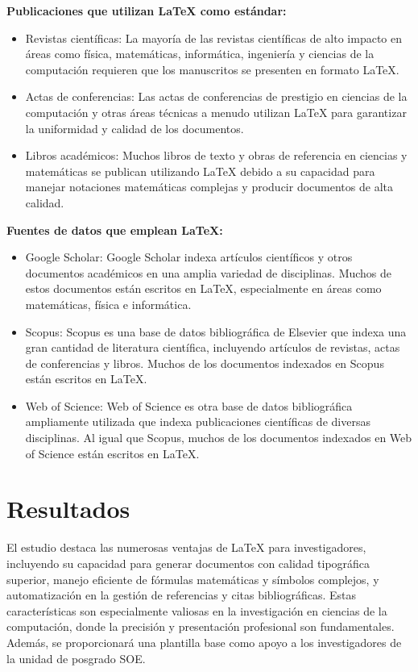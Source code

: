 \documentclass[10pt,twocolumn,a4paper]{article}
\begin{document}
{\raggedleft \textbf{Publicaciones que utilizan LaTeX como estándar:}}

\begin{itemize}
	\item Revistas científicas: La mayoría de las revistas científicas de alto impacto en áreas como física, matemáticas, informática, ingeniería y ciencias de la computación requieren que los manuscritos se presenten en formato LaTeX.
	\item Actas de conferencias: Las actas de conferencias de prestigio en ciencias de la computación y otras áreas técnicas a menudo utilizan LaTeX para garantizar la uniformidad y calidad de los documentos.
	\item Libros académicos: Muchos libros de texto y obras de referencia en ciencias y matemáticas se publican utilizando LaTeX debido a su capacidad para manejar notaciones matemáticas complejas y producir documentos de alta calidad.
\end{itemize}

{\raggedleft \textbf{Fuentes de datos que emplean LaTeX:}}
\begin{itemize}
	\item Google Scholar: Google Scholar indexa artículos científicos y otros documentos académicos en una amplia variedad de disciplinas. Muchos de estos documentos están escritos en LaTeX, especialmente en áreas como matemáticas, física e informática.
	\item Scopus: Scopus es una base de datos bibliográfica de Elsevier que indexa una gran cantidad de literatura científica, incluyendo artículos de revistas, actas de conferencias y libros. Muchos de los documentos indexados en Scopus están escritos en LaTeX.
	\item Web of Science: Web of Science es otra base de datos bibliográfica ampliamente utilizada que indexa publicaciones científicas de diversas disciplinas. Al igual que Scopus, muchos de los documentos indexados en Web of Science están escritos en LaTeX.
\end{itemize}

\newpage %
\vspace{0.5cm}

    \section{Resultados}
    El estudio destaca las numerosas ventajas de LaTeX para investigadores, incluyendo su capacidad para generar documentos con calidad tipográfica superior, manejo eficiente de fórmulas matemáticas y símbolos complejos, y automatización en la gestión de referencias y citas bibliográficas. 
    Estas características son especialmente valiosas en la investigación en ciencias de la computación, donde la precisión y presentación profesional son fundamentales. 
    Además, se proporcionará una plantilla base como apoyo a los investigadores de la unidad de posgrado SOE.
\end{document}
